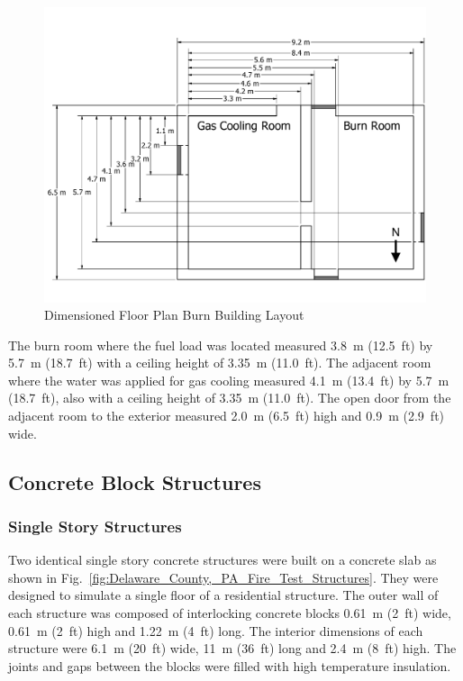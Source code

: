 \documentclass[12pt,oneside]{book}
\begin{document}
\begin{figure}[!ht]
	\includegraphics[width=\columnwidth]{../Figures/Floor_Plans/PDFs/West_Structure/DelCo_2012_West_Structure_Plain}
	\caption{Dimensioned Floor Plan Burn Building Layout}
	\label{fig:Delaware_County,_PA_Burn_Building_Layout}
\end{figure}

The burn room where the fuel load was located measured 3.8~m (12.5~ft) by 5.7~m (18.7~ft) with a ceiling height of 3.35~m (11.0~ft). The adjacent room where the water was applied for gas cooling measured 4.1~m (13.4~ft) by 5.7~m (18.7~ft), also with a ceiling height of 3.35~m (11.0~ft). The open door from the adjacent room to the exterior measured 2.0~m (6.5~ft) high and 0.9~m (2.9~ft) wide.

\subsection{Concrete Block Structures}
\label{sec:Experimental Structures}
\subsubsection*{Single Story Structures}

Two identical single story concrete structures were built on a concrete slab as shown in Fig.~\ref{fig:Delaware_County,_PA_Fire_Test_Structures}. They were designed to simulate a single floor of a residential structure.  The outer wall of each structure was composed of interlocking concrete blocks 0.61~m (2~ft) wide, 0.61~m (2~ft) high and 1.22~m (4~ft) long.  The interior dimensions of each structure were 6.1~m (20~ft) wide, 11~m (36~ft) long and 2.4~m (8~ft) high. The joints and gaps between the blocks were filled with high temperature insulation.
\end{document}
